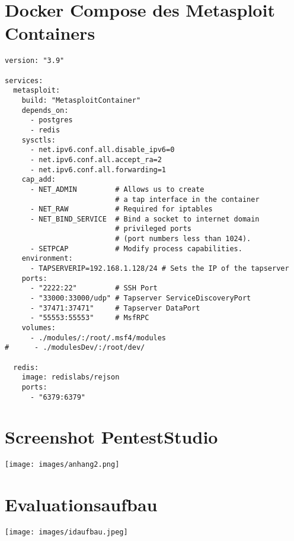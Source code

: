 \chapter{Docker Compose des Metasploit Containers}\label{sec:anhang}

\begin{verbatim}
version: "3.9"

services:
  metasploit:
    build: "MetasploitContainer"
    depends_on:
      - postgres
      - redis
    sysctls:
      - net.ipv6.conf.all.disable_ipv6=0
      - net.ipv6.conf.all.accept_ra=2
      - net.ipv6.conf.all.forwarding=1
    cap_add:
      - NET_ADMIN         # Allows us to create 
                          # a tap interface in the container
      - NET_RAW           # Required for iptables
      - NET_BIND_SERVICE  # Bind a socket to internet domain
                          # privileged ports 
                          # (port numbers less than 1024).
      - SETPCAP           # Modify process capabilities.
    environment:
      - TAPSERVERIP=192.168.1.128/24 # Sets the IP of the tapserver
    ports:
      - "2222:22"         # SSH Port
      - "33000:33000/udp" # Tapserver ServiceDiscoveryPort
      - "37471:37471"     # Tapserver DataPort
      - "55553:55553"     # MsfRPC
    volumes:
      - ./modules/:/root/.msf4/modules
#      - ./modulesDev/:/root/dev/

  redis:
    image: redislabs/rejson
    ports:
      - "6379:6379"
\end{verbatim}

\chapter{Screenshot PentestStudio}\label{sec:penteststudio}

\texttt{[image: images/anhang2.png]}

\chapter{Evaluationsaufbau}\label{sec:evaluationsaufbau}

\texttt{[image: images/idaufbau.jpeg]}
